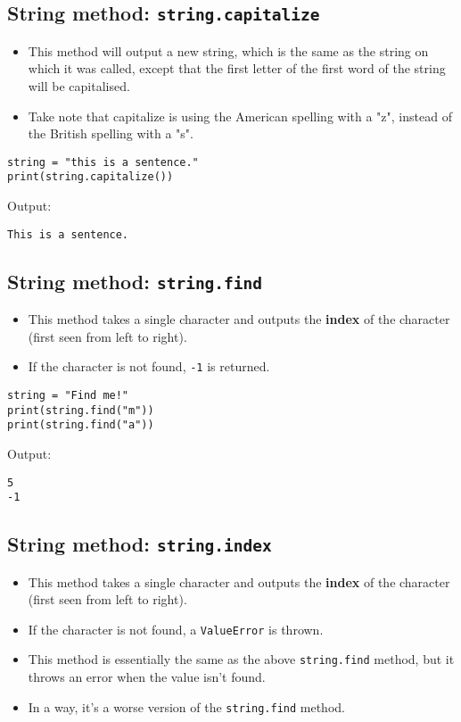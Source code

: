 \documentclass[11pt]{article}
\begin{document}
\subsection{String method: \texttt{string.capitalize}}
\label{sec:org721e56a}
\begin{itemize}
\item This method will output a new string, which is the same as the string on which it was called, except that the first letter of the first word of the string will be capitalised.
\item Take note that capitalize is using the American spelling with a "z", instead of the British spelling with a "s".
\end{itemize}

\begin{verbatim}
string = "this is a sentence."
print(string.capitalize())
\end{verbatim}

 \noindent Output:

\label{org9cb7595}
\begin{verbatim}
This is a sentence.
\end{verbatim}
\subsection{String method: \texttt{string.find}}
\label{sec:org89c24fd}
\begin{itemize}
\item This method takes a single character and outputs the \textbf{index} of the character (first seen from left to right).
\item If the character is not found, \texttt{-1} is returned.
\end{itemize}

\begin{verbatim}
string = "Find me!"
print(string.find("m"))
print(string.find("a"))
\end{verbatim}

 \noindent Output:

\label{org5d7e1cd}
\begin{verbatim}
5
-1
\end{verbatim}


 \newpage
\subsection{String method: \texttt{string.index}}
\label{sec:org19f0822}
\begin{itemize}
\item This method takes a single character and outputs the \textbf{index} of the character (first seen from left to right).
\item If the character is not found, a \texttt{ValueError} is thrown.
\item This method is essentially the same as the above \texttt{string.find} method, but it throws an error when the value isn't found.
\item In a way, it's a worse version of the \texttt{string.find} method.
\end{itemize}
\end{document}
